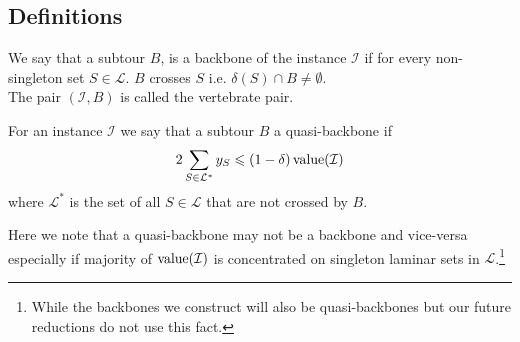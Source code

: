 \documentclass[./main.tex]{subfiles}
\newcommand{\calI}{\ensuremath{\mathcal{I}}}
\newcommand{\calL}{\ensuremath{\mathcal{L}}}
\begin{document}
	\subsection{Definitions}
	\begin{definition}
		We say that a subtour $B$, is a backbone of the instance $\calI$ if for every non-singleton set $S \in \calL$. $B$ crosses $S$ i.e. $\delta(S) \cap B \ne \emptyset$.\\
		The pair $(\calI, B)$ is called the vertebrate pair.
	\end{definition}\vspace{2mm}
	\begin{definition}
		For an instance $\calI$ we say that a subtour $B$ a quasi-backbone if 
		\begin{equation}\label{def:6:q-bb}
			2\sum_{S \in \calL^*} y_S \leqslant \left(1 - \delta\right)\val(\calI)
		\end{equation}
		where $\calL^*$ is the set of all $S \in \calL$ that are not crossed by $B$.
	\end{definition}\vspace{2mm}
	Here we note that a quasi-backbone may not be a backbone and vice-versa especially if majority of $\val(\calI)$ is concentrated on singleton laminar sets in $\calL$.\footnote{While the backbones we construct will also be quasi-backbones but our future reductions do not use this fact.}
	
\end{document}
